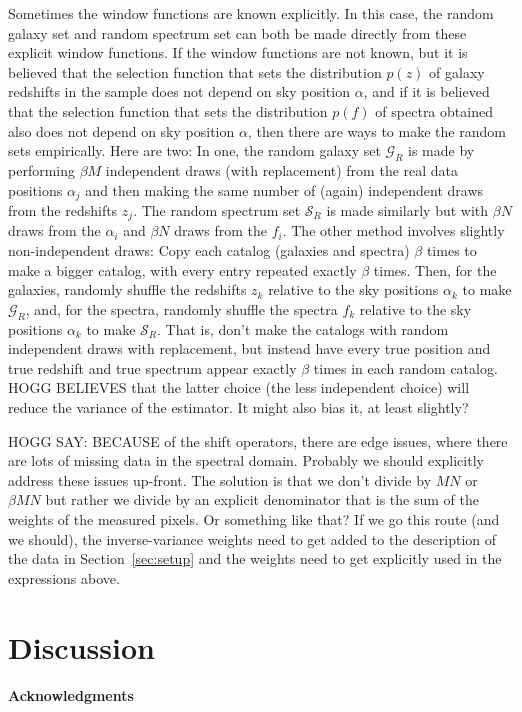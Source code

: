 \documentclass{article}
\newcommand{\sectionname}{Section}
\newcommand{\secref}[1]{\sectionname~\ref{#1}}
\newcommand{\set}[1]{\mathscr{#1}}
\begin{document}
Sometimes the window functions are known explicitly.
In this case, the random galaxy set and random spectrum set can both be made directly from these explicit window functions.
If the window functions are not known, but it is believed that the selection function that sets the distribution $p(z)$ of galaxy redshifts in the sample does not depend on sky position $\alpha$, and if it is believed that the selection function that sets the distribution $p(f)$ of spectra obtained also does not depend on sky position $\alpha$, then there are ways to make the random sets empirically.
Here are two:
In one, the random galaxy set $\set{G}_R$ is made by performing $\beta M$ independent draws (with replacement) from the real data positions $\alpha_j$ and then making the same number of (again) independent draws from the redshifts $z_j$.
The random spectrum set $\set{S}_R$ is made similarly but with $\beta N$ draws from the $\alpha_i$ and $\beta N$ draws from the $f_i$. 
The other method involves slightly non-independent draws:
Copy each catalog (galaxies and spectra) $\beta$ times to make a bigger catalog, with every entry repeated exactly $\beta$ times.
Then, for the galaxies, randomly shuffle the redshifts $z_k$ relative to the sky positions $\alpha_k$ to make $\set{G}_R$,
and, for the spectra, randomly shuffle the spectra $f_k$ relative to the sky positions $\alpha_k$ to make $\set{S}_R$. 
That is, don't make the catalogs with random independent draws with replacement, but instead have every true position and true redshift and true spectrum appear exactly $\beta$ times in each random catalog.
HOGG BELIEVES that the latter choice (the less independent choice) will reduce the variance of the estimator.
It might also bias it, at least slightly?

HOGG SAY: BECAUSE of the shift operators, there are edge issues, where there are lots of missing data in the spectral domain.
Probably we should explicitly address these issues up-front.
The solution is that we don't divide by $MN$ or $\beta MN$ but rather we divide by an explicit denominator that is the sum of the weights of the measured pixels.
Or something like that?
If we go this route (and we should), the inverse-variance weights need to get added to the description of the data in \secref{sec:setup} and the weights need to get explicitly used in the expressions above.

\section{Discussion}\label{sec:discussion}

\paragraph{Acknowledgments}


\end{document}
